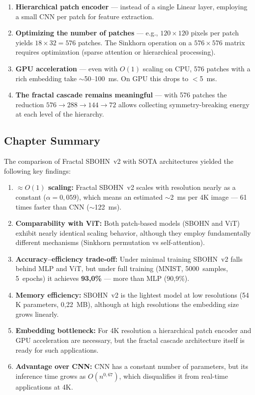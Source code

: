 \documentclass[11pt,a4paper]{report}
\begin{document}
\begin{enumerate}
    \item \textbf{Hierarchical patch encoder} --- instead of a single Linear layer, employing a small CNN per patch for feature extraction.
    \item \textbf{Optimizing the number of patches} --- e.g., $120\times120$ pixels per patch yields $18\times32 = 576$ patches. The Sinkhorn operation on a $576\times576$ matrix requires optimization (sparse attention or hierarchical processing).
    \item \textbf{GPU acceleration} --- even with $O(1)$ scaling on CPU, 576 patches with a rich embedding take $\sim$50--100~ms. On GPU this drops to $<$5~ms.
    \item \textbf{The fractal cascade remains meaningful} --- with 576 patches the reduction $576 \to 288 \to 144 \to 72$ allows collecting symmetry-breaking energy at each level of the hierarchy.
\end{enumerate}


\subsection*{Chapter Summary}

The comparison of Fractal SBOHN~v2 with SOTA architectures yielded the following key findings:

\begin{enumerate}
    \item \textbf{$\approx O(1)$ scaling:} Fractal SBOHN~v2 scales with resolution nearly as a constant ($\alpha = 0{,}059$), which means an estimated $\sim$2~ms per 4K image --- 61 times faster than CNN ($\sim$122~ms).
    
    \item \textbf{Comparability with ViT:} Both patch-based models (SBOHN and ViT) exhibit nearly identical scaling behavior, although they employ fundamentally different mechanisms (Sinkhorn permutation vs self-attention).
    
    \item \textbf{Accuracy--efficiency trade-off:} Under minimal training SBOHN~v2 falls behind MLP and ViT, but under full training (MNIST, 5000~samples, 5~epochs) it achieves \textbf{93{,}0\%} --- more than MLP (90{,}9\%).
    
    \item \textbf{Memory efficiency:} SBOHN~v2 is the lightest model at low resolutions (54\,K parameters, 0{,}22~MB), although at high resolutions the embedding size grows linearly.
    
    \item \textbf{Embedding bottleneck:} For 4K resolution a hierarchical patch encoder and GPU acceleration are necessary, but the fractal cascade architecture itself is ready for such applications.
    
    \item \textbf{Advantage over CNN:} CNN has a constant number of parameters, but its inference time grows as $O(n^{0{,}67})$, which disqualifies it from real-time applications at 4K.
\end{enumerate}
\end{document}
